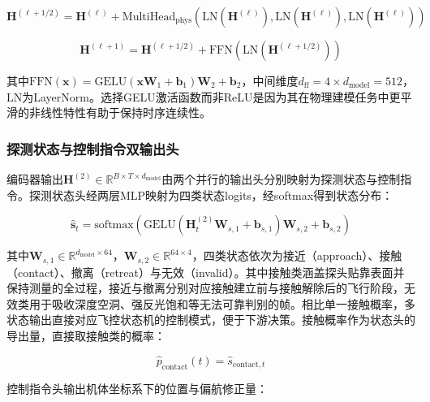 \begin{equation}
\mathbf{H}^{(\ell+1/2)} = \mathbf{H}^{(\ell)} + \text{MultiHead}_{\text{phys}}(\text{LN}(\mathbf{H}^{(\ell)}), \text{LN}(\mathbf{H}^{(\ell)}), \text{LN}(\mathbf{H}^{(\ell)}))
\label{eq:encoder_attn}
\end{equation}

\begin{equation}
\mathbf{H}^{(\ell+1)} = \mathbf{H}^{(\ell+1/2)} + \text{FFN}(\text{LN}(\mathbf{H}^{(\ell+1/2)}))
\label{eq:encoder_ffn}
\end{equation}

其中$\text{FFN}(\mathbf{x}) = \text{GELU}(\mathbf{x}\mathbf{W}_1 + \mathbf{b}_1)\mathbf{W}_2 + \mathbf{b}_2$，中间维度$d_{\text{ff}} = 4 \times d_{\text{model}} = 512$，$\text{LN}$为LayerNorm。选择GELU激活函数而非ReLU是因为其在物理建模任务中更平滑的非线性特性有助于保持时序连续性。

\subsubsection{探测状态与控制指令双输出头}

编码器输出$\mathbf{H}^{(2)} \in \mathbb{R}^{B \times T \times d_{\text{model}}}$由两个并行的输出头分别映射为探测状态与控制指令。探测状态头经两层MLP映射为四类状态logits，经softmax得到状态分布：

\begin{equation}
\hat{\mathbf{s}}_t = \text{softmax}\left(\text{GELU}(\mathbf{H}_t^{(2)} \mathbf{W}_{s,1} + \mathbf{b}_{s,1}) \mathbf{W}_{s,2} + \mathbf{b}_{s,2}\right)
\label{eq:state_head}
\end{equation}

其中$\mathbf{W}_{s,1} \in \mathbb{R}^{d_{\text{model}} \times 64}$，$\mathbf{W}_{s,2} \in \mathbb{R}^{64 \times 4}$，四类状态依次为接近（approach）、接触（contact）、撤离（retreat）与无效（invalid）。其中接触类涵盖探头贴靠表面并保持测量的全过程，接近与撤离分别对应接触建立前与接触解除后的飞行阶段，无效类用于吸收深度空洞、强反光饱和等无法可靠判别的帧。相比单一接触概率，多状态输出直接对应飞控状态机的控制模式，便于下游决策。接触概率作为状态头的导出量，直接取接触类的概率：

\begin{equation}
\hat{p}_{\text{contact}}(t) = \hat{s}_{\text{contact},t}
\label{eq:contact_prob_from_state}
\end{equation}

控制指令头输出机体坐标系下的位置与偏航修正量：

